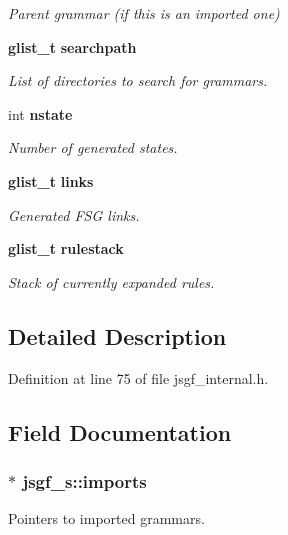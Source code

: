\begin{DoxyCompactItemize}
\begin{DoxyCompactList}\small\item\em Parent grammar (if this is an imported one) \end{DoxyCompactList}\item 
{\bf glist\+\_\+t} {\bf searchpath}
\begin{DoxyCompactList}\small\item\em List of directories to search for grammars. \end{DoxyCompactList}\item 
int {\bf nstate}
\begin{DoxyCompactList}\small\item\em Number of generated states. \end{DoxyCompactList}\item 
{\bf glist\+\_\+t} {\bf links}
\begin{DoxyCompactList}\small\item\em Generated F\+S\+G links. \end{DoxyCompactList}\item 
{\bf glist\+\_\+t} {\bf rulestack}
\begin{DoxyCompactList}\small\item\em Stack of currently expanded rules. \end{DoxyCompactList}\end{DoxyCompactItemize}


\subsection{Detailed Description}


Definition at line 75 of file jsgf\+\_\+internal.\+h.



\subsection{Field Documentation}
\subsubsection[{imports}]{$\ast$ jsgf\+\_\+s\+::imports}\label{structjsgf__s_a7efd071684d4ef7f077b0b06ce7bbc78}


Pointers to imported grammars. 



